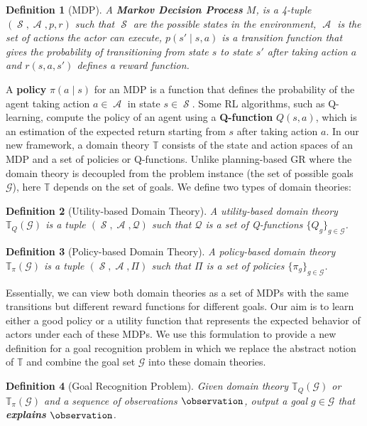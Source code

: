 \documentclass[letterpaper]{article} %
\DeclareMathOperator{\statespace}{\mathcal{S}}
\DeclareMathOperator{\actionspace}{\mathcal{A}}
\providecommand\theory{\mathbb{T}}
\providecommand\goals{\mathcal{G}}
\newtheorem{definition}{Definition}
\begin{document}
\begin{definition}[MDP]
A \textbf{Markov Decision Process} $M$, is a 4-tuple $(\statespace, \actionspace, p, r)$ such that $\statespace$ are the possible states in the environment, $\actionspace$ is the set of actions the actor can execute, $p(s' \mid s, a)$ is a transition function that gives the probability of transitioning from state $s$ to state $s'$ after taking action $a$ and $r(s, a, s')$ defines a reward function.
\end{definition}

A \textbf{policy} $\pi(a \mid s)$ for an MDP is a function that defines the probability of the agent taking action $a \in \actionspace$ in state $s \in \statespace$. 
Some RL algorithms, such as Q-learning, compute the policy of an agent using a \textbf{Q-function} $Q(s,a)$, which is an estimation of the expected return starting from $s$ after taking action $a$. %
In our new framework, a domain theory $\theory$ consists of the state and action spaces of an MDP and a set of policies or Q-functions. 
Unlike planning-based GR where the domain theory is decoupled from the problem instance (the set of possible goals $\goals$), here $\theory$ depends on the set of goals. 
We define two types of domain theories:

\begin{definition}[Utility-based Domain Theory]
A utility-ba\-sed domain theory $\theory_Q(\goals)$ is a tuple $(\statespace, \actionspace, \mathcal{Q})$ such that $\mathcal{Q}$ is a set of Q-functions $\{Q_g\}_{g \in \goals}$.
\end{definition}

\begin{definition}[Policy-based Domain Theory]
A policy-ba\-sed domain theory $\theory_{\pi}(\goals)$ is a tuple $(\statespace, \actionspace, \Pi)$ such that $\Pi$ is a set of policies $\{\pi_g\}_{g \in \goals}$.
\end{definition}

Essentially, we can view both domain theories as a set of MDPs with the same transitions but different reward functions for different goals. 
Our aim is to learn either a good policy or a utility function that represents the expected behavior of actors under each of these MDPs. 
We use this formulation to provide a new definition for a goal recognition problem in which we replace the abstract notion of $\theory$ and combine the goal set $\goals$ into these domain theories.

\begin{definition}[Goal Recognition Problem]
%
%
%
Given domain theory $\theory_Q(\goals)$ or $\theory_{\pi}(\goals)$ and a sequence of observations $\observation$, output a goal $g\in \goals$ that \textbf{explains} $\observation$.
\end{definition}
\end{document}
